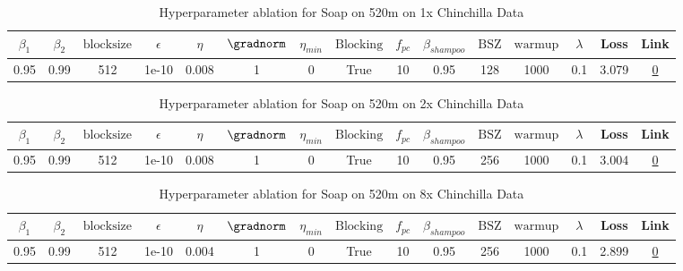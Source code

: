 \begin{table}[H]
\centering
\caption{Hyperparameter ablation for Soap on 520m on 1x Chinchilla Data}
\label{tab:ablation_soap_520m_1}
\begin{tabular}{ccccccccccccccc}
\toprule
$\beta_1$ & $\beta_2$ & $\mathrm{block size}$ & $\epsilon$ & $\eta$ & $\gradnorm$ & $\eta_{min}$ & $\mathrm{Blocking}$ & $f_{pc}$ & $\beta_{shampoo}$ & $\mathrm{BSZ}$ & $\mathrm{warmup}$ & $\lambda$ & Loss & Link \\
\midrule
0.95 & 0.99 & 512 & 1e-10 & 0.008 & 1 & 0 & True & 10 & 0.95 & 128 & 1000 & 0.1 & 3.079 & \href{https://wandb.ai/stanford-mercury/optimizer-scaling/runs/sweep-520m-10B-soape9baa74lr0.008-wd0.1-minlr0-warmup1000-b10.95-8d30a7}{0} \\
\midrule
\bottomrule
\end{tabular}
\end{table}

\begin{table}[H]
\centering
\caption{Hyperparameter ablation for Soap on 520m on 2x Chinchilla Data}
\label{tab:ablation_soap_520m_2}
\begin{tabular}{ccccccccccccccc}
\toprule
$\beta_1$ & $\beta_2$ & $\mathrm{block size}$ & $\epsilon$ & $\eta$ & $\gradnorm$ & $\eta_{min}$ & $\mathrm{Blocking}$ & $f_{pc}$ & $\beta_{shampoo}$ & $\mathrm{BSZ}$ & $\mathrm{warmup}$ & $\lambda$ & Loss & Link \\
\midrule
0.95 & 0.99 & 512 & 1e-10 & 0.008 & 1 & 0 & True & 10 & 0.95 & 256 & 1000 & 0.1 & 3.004 & \href{https://wandb.ai/stanford-mercury/optimizer-scaling/runs/sweep-520m-21B-soapea9baa74lr0.008-wd0.1-minlr0-warmup1000-b10.9-7994bc}{0} \\
\midrule
\bottomrule
\end{tabular}
\end{table}

\begin{table}[H]
\centering
\caption{Hyperparameter ablation for Soap on 520m on 8x Chinchilla Data}
\label{tab:ablation_soap_520m_8}
\begin{tabular}{ccccccccccccccc}
\toprule
$\beta_1$ & $\beta_2$ & $\mathrm{block size}$ & $\epsilon$ & $\eta$ & $\gradnorm$ & $\eta_{min}$ & $\mathrm{Blocking}$ & $f_{pc}$ & $\beta_{shampoo}$ & $\mathrm{BSZ}$ & $\mathrm{warmup}$ & $\lambda$ & Loss & Link \\
\midrule
0.95 & 0.99 & 512 & 1e-10 & 0.004 & 1 & 0 & True & 10 & 0.95 & 256 & 1000 & 0.1 & 2.899 & \href{https://wandb.ai/stanford-mercury/optimizer-scaling/runs/sweep-520m-85B-soapeaa7a19flr0.004-wd0.1-minlr0-warmup1000-b10.9-fe941f}{0} \\
\midrule
\bottomrule
\end{tabular}
\end{table}


